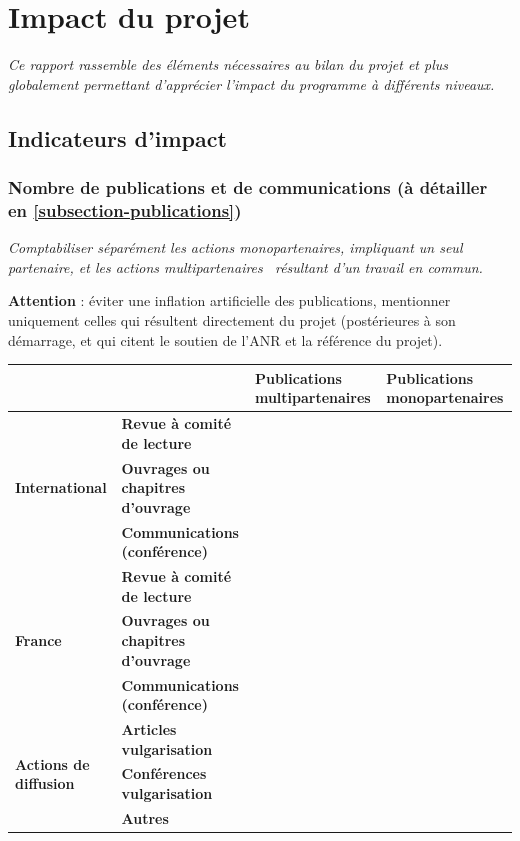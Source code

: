 \documentclass[a4paper,11pt]{article}
\newcommand{\tableheader}[1]{\textbf{\textcolor{ANRbleu}{#1}}}
\newcommand{\instructions}[1]{%
		{%
			\setlength{\parindent}{0cm}%
			{\em\color{ANRvert}#1}%
		}%
	}
\newcommand{\instructions}[1]{}
\begin{document}
\section{Impact du projet}

\instructions{
Ce rapport rassemble des éléments nécessaires au bilan du projet et plus globalement permettant d'apprécier l'impact du programme à différents niveaux.
}

\subsection{Indicateurs d'impact}

\subsubsection{Nombre de publications et de communications (à détailler en \cref{subsection-publications})}

\instructions{
Comptabiliser séparément les actions monopartenaires, impliquant un seul partenaire, et les actions multipartenaires~ résultant d'un travail en commun.

\textbf{Attention} : éviter une inflation artificielle des publications, mentionner uniquement celles qui résultent directement du projet (postérieures à son démarrage, et qui citent le soutien de l'ANR et la référence du projet).
}


\noindent\begin{tabular}{| p{3.5cm} | p{6cm} | p{3cm} | p{3cm} |}
	\hline
	& & \tableheader{Publications \mbox{multipartenaires}} & \tableheader{Publications \mbox{monopartenaires}} \\
	\hline
	\multirow{3}{*}{\tableheader{International}} & \tableheader{Revue à comité de lecture} & &  \\
	\cline{2-4}
	& \tableheader{Ouvrages ou chapitres d'ouvrage} & & \\
	\cline{2-4}
	& \tableheader{Communications (conférence)} & & \\
	\hline
	\multirow{3}{*}{\tableheader{France}} & \tableheader{Revue à comité de lecture} & &  \\
	\cline{2-4}
	& \tableheader{Ouvrages ou chapitres d'ouvrage} & & \\
	\cline{2-4}
	& \tableheader{Communications (conférence)} & & \\
	\hline
	\multirow{3}{*}{\tableheader{Actions de diffusion}} & \tableheader{Articles vulgarisation} & &  \\
	\cline{2-4}
	& \tableheader{Conférences vulgarisation} & & \\
	\cline{2-4}
	& \tableheader{Autres} & & \\
	\hline
\end{tabular}
\end{document}
